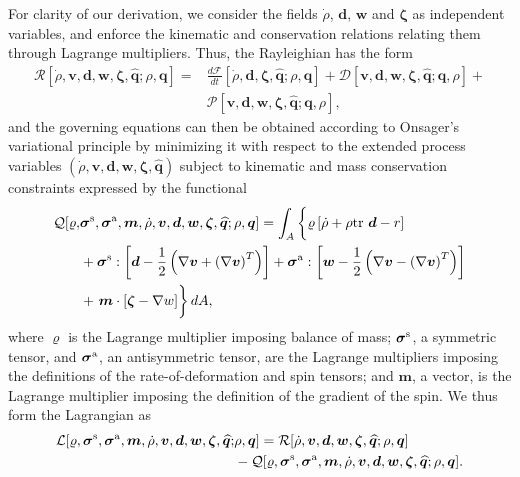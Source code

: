 \documentclass[12pt]{iopart}
\begin{document}
	For clarity of our derivation, we consider the fields $\dot{\rho}$, $\bm{d}$, $\bm{w}$ and $\bm{\zeta}$ as independent variables, and enforce the kinematic and conservation relations relating them through Lagrange multipliers. Thus, the Rayleighian has the form
	\begin{eqnarray} 
		\mathcal{R}\left[\dot{\rho},\bm{v},\bm{d},\bm{w},\bm{\zeta},\widehat{\bm{q}};\rho,\bm{q}\right] = & \frac{d{\mathcal{F}}}{dt}[\dot{\rho},\bm{d},\bm{\zeta},\widehat{\bm{q}}; \rho,\bm{q}] + \nonumber
		\mathcal{D}\left[\bm{v},\bm{d},\bm{w},\bm{\zeta},\widehat{\bm{q}}; \bm{q},\rho\right] +  \\ & \mathcal{P}\left[\bm{v},\bm{d},\bm{w},\bm{\zeta},\widehat{\bm{q}}; \bm{q},\rho\right], 	\label{eq:Rayleighian}
	\end{eqnarray}
	and the governing equations can then be obtained according to Onsager's variational principle by minimizing it with respect to the extended process variables $\left(\dot{\rho}, \bm{v},\bm{d},\bm{w},\bm{\zeta},\widehat{\bm{q}}\right)$ subject to  kinematic and mass conservation constraints expressed by the functional
	\begin{eqnarray} 
		\mathcal{Q}[\varrho, & \bm{\sigma}^{\rm s}, \bm{\sigma}^{\rm a},  \bm{m}, \dot{\rho},\bm{v},\bm{d},\bm{w},\bm{\zeta},\widehat{\bm{q}};\rho,\bm{q}] =
		\int_A \left\{ \varrho  \left[\dot{\rho} + \rho{\rm tr}~\bm{d}- r\right] \vphantom{\frac{1}{2}}\right.\nonumber\\
		& +\bm{\sigma}^{\rm s} :\left[\bm{d} - \frac{1}{2}\left(\nabla \bm{v} + \left(\nabla\bm{v}\right)^T\right)\right]  %
		+\bm{\sigma}^{\rm a} :\left[\bm{w} - \frac{1}{2}\left(\nabla \bm{v} - \left(\nabla\bm{v}\right)^T\right)\right]  \nonumber\\
		& +\left. \vphantom{\frac{1}{2}}\bm{m} \cdot \left[\bm{\zeta} - \nabla w\right] \right\}dA, \label{eq:constraints}
	\end{eqnarray}
	where $\varrho $ is the Lagrange multiplier imposing balance of mass; $\bm{\sigma}^{\rm s}$, a symmetric tensor, and $\bm{\sigma}^{\rm a}$, an antisymmetric tensor, are the Lagrange multipliers imposing the definitions of the rate-of-deformation and spin tensors; and $\bm{m}$, a vector, is the Lagrange multiplier imposing the definition of the gradient of the spin.  We thus form the  Lagrangian as 
	\begin{eqnarray} 
		\mathcal{L}[\varrho, \bm{\sigma}^{\rm s}, \bm{\sigma}^{\rm a},\bm{m},\dot{\rho},\bm{v},\bm{d},\bm{w},\bm{\zeta},\widehat{\bm{q}};&\rho,\bm{q}] = \mathcal{R}[\dot{\rho},\bm{v},\bm{d},\bm{w},\bm{\zeta},\widehat{\bm{q}};\rho,\bm{q}] \nonumber \\
		&-\mathcal{Q}[\varrho, \bm{\sigma}^{\rm s}, \bm{\sigma}^{\rm a},\bm{m}, \dot{\rho},\bm{v},\bm{d},\bm{w},\bm{\zeta},\widehat{\bm{q}};\rho,\bm{q}].	\label{eq:Lagrangian} 
	\end{eqnarray}
	
\end{document}
